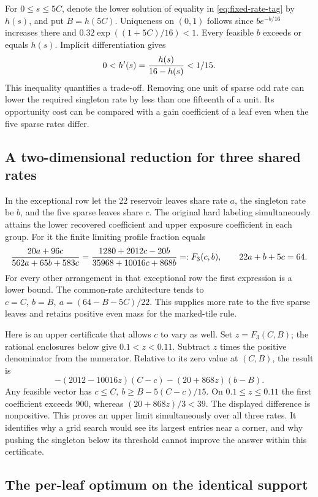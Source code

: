 \documentclass[12pt,letterpaper]{article}
\begin{document}
For \(0\le s\le5C\), denote the lower solution of equality in
\eqref{eq:fixed-rate-tag} by \(h(s)\), and put \(B=h(5C)\). Uniqueness on \((0,1)\) follows since \(b e^{-b/16}\) increases there and \(0.32\exp((1+5C)/16)<1\). Every feasible \(b\) exceeds or equals \(h(s)\). Implicit differentiation gives
\[
 0<h'(s)={h(s)\over16-h(s)}<1/15.
\]
This inequality quantifies a trade-off. Removing one unit of sparse odd rate can lower the required singleton rate by less than one fifteenth of a unit. Its opportunity cost can be compared with a gain coefficient of a leaf even when the five sparse rates differ.

\subsection{A two-dimensional reduction for three shared rates}

In the exceptional row let the 22 reservoir leaves share rate \(a\), the singleton rate be \(b\), and the five sparse leaves share \(c\). The original hard labeling simultaneously attains the lower recovered coefficient and upper exposure coefficient in each group. For it the finite limiting profile fraction equals
\[
 {20a+96c\over562a+65b+583c}
 ={1280+2012c-20b\over35968+10016c+868b}
 =:F_3(c,b),
 \qquad 22a+b+5c=64.
\]
For every other arrangement in that exceptional row the first expression is a lower bound. The common-rate architecture tends to \(c=C,\ b=B,\ a=(64-B-5C)/22\). This supplies more rate to the five sparse leaves and retains positive even mass for the marked-tile rule.

Here is an upper certificate that allows \(c\) to vary as well. Set \(z=F_3(C,B)\); the rational enclosures below give \(0.1<z<0.11\). Subtract \(z\) times the positive denominator from the numerator. Relative to its zero value at \((C,B)\), the result is
\[
 -(2012-10016z)(C-c)-(20+868z)(b-B).
\]
Any feasible vector has \(c\le C,\ b\ge B-5(C-c)/15\). On \(0.1\le z\le0.11\) the first coefficient exceeds 900, whereas \((20+868z)/3<39\). The displayed difference is nonpositive. This proves an upper limit simultaneously over all three rates. It identifies why a grid search would see its largest entries near a corner, and why pushing the singleton below its threshold cannot improve the answer within this certificate.

\subsection{The per-leaf optimum on the identical support}
\end{document}
